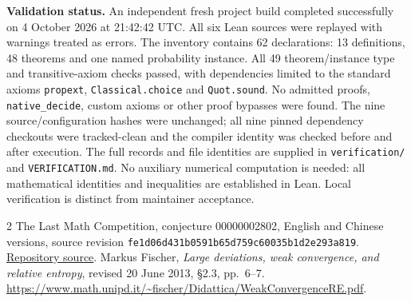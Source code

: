 \documentclass[11pt,a4paper]{article}
\newcommand{\code}[1]{\nolinkurl{#1}}
\begin{document}
\textbf{Validation status.}
An independent fresh project build completed successfully on 4 October 2026 at 21:42:42 UTC. All six Lean sources were replayed with warnings treated as errors. The inventory contains 62 declarations: 13 definitions, 48 theorems and one named probability instance. All 49 theorem/instance type and transitive-axiom checks passed, with dependencies limited to the standard axioms \code{propext}, \code{Classical.choice} and \code{Quot.sound}. No admitted proofs, \code{native_decide}, custom axioms or other proof bypasses were found. The nine source/configuration hashes were unchanged; all nine pinned dependency checkouts were tracked-clean and the compiler identity was checked before and after execution. The full records and file identities are supplied in \code{verification/} and \code{VERIFICATION.md}. No auxiliary numerical computation is needed: all mathematical identities and inequalities are established in Lean. Local verification is distinct from maintainer acceptance.

\begin{thebibliography}{2}\small
{} The Last Math Competition, conjecture 00000002802, English and Chinese versions, source revision \code{fe1d06d431b0591b65d759c60035b1d2e293a819}. \href{https://github.com/The-Last-Math-Competition/The-Last-Math-Competition/blob/fe1d06d431b0591b65d759c60035b1d2e293a819/conjectures/00000002802.md}{Repository source}.
 Markus Fischer, \emph{Large deviations, weak convergence, and relative entropy}, revised 20 June 2013, \S2.3, pp.~6--7. \url{https://www.math.unipd.it/~fischer/Didattica/WeakConvergenceRE.pdf}.
\end{thebibliography}
\end{document}
